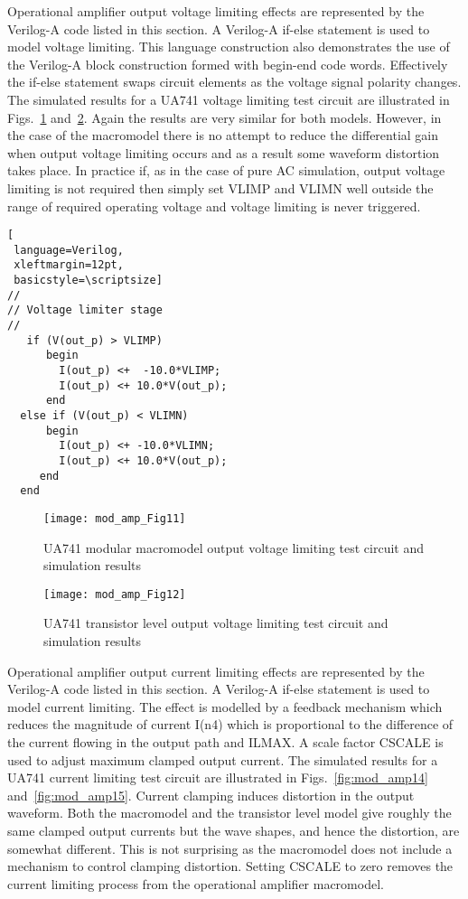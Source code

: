 Operational amplifier output voltage limiting effects are represented
by the Verilog-A code listed in this section. A Verilog-A if-else
statement is used to model voltage limiting.  This language
construction also demonstrates the use of the Verilog-A block
construction formed with begin-end code words.  Effectively the
if-else statement swaps circuit elements as the voltage signal
polarity changes.  The simulated results for a UA741 voltage limiting
test circuit are illustrated in Figs.~\ref{fig:mod_amp11}
and~\ref{fig:mod_amp12}. Again the results are very similar for both
models. However, in the case of the macromodel there is no attempt to
reduce the differential gain when output voltage limiting occurs and
as a result some waveform distortion takes place.  In practice if, as
in the case of pure AC simulation, output voltage limiting is not
required then simply set VLIMP and VLIMN well outside the range of
required operating voltage and voltage limiting is never triggered.

\begin{lstlisting}[
 language=Verilog, 
 xleftmargin=12pt,
 basicstyle=\scriptsize]
//
// Voltage limiter stage
//
   if (V(out_p) > VLIMP)
      begin
        I(out_p) <+  -10.0*VLIMP;
        I(out_p) <+ 10.0*V(out_p);
      end
  else if (V(out_p) < VLIMN)
      begin
        I(out_p) <+ -10.0*VLIMN;
        I(out_p) <+ 10.0*V(out_p);
     end
  end
\end{lstlisting}

\begin{figure} [h]
  \centering
  \texttt{[image: mod\_amp\_Fig11]}
  \caption{UA741 modular macromodel output voltage limiting test circuit and simulation results}
  \label{fig:mod_amp11}
\end{figure} 


\begin{figure} [h]
  \centering
  \texttt{[image: mod\_amp\_Fig12]}
  \caption{UA741 transistor level output voltage limiting test circuit and simulation results}
  \label{fig:mod_amp12}
\end{figure} 


Operational amplifier output current limiting effects are represented
by the Verilog-A code listed in this section. A Verilog-A if-else
statement is used to model current limiting.  The effect is modelled
by a feedback mechanism which reduces the magnitude of current I(n4)
which is proportional to the difference of the current flowing in the
output path and ILMAX.  A scale factor CSCALE is used to adjust
maximum clamped output current.  The simulated results for a UA741
current limiting test circuit are illustrated in
Figs.~\ref{fig:mod_amp14} and~\ref{fig:mod_amp15}. Current clamping
induces distortion in the output waveform. Both the macromodel and the
transistor level model give roughly the same clamped output currents
but the wave shapes, and hence the distortion, are somewhat different.
This is not surprising as the macromodel does not include a mechanism
to control clamping distortion. Setting CSCALE to zero removes the
current limiting process from the operational amplifier macromodel.


